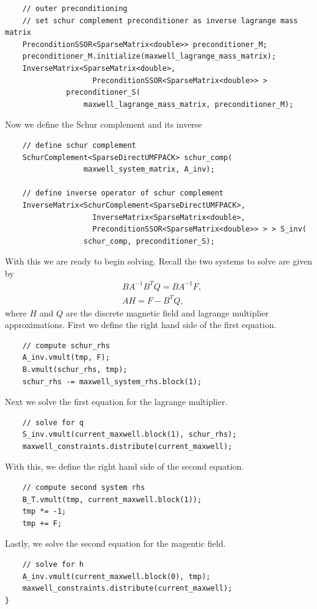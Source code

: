 \documentclass{article}
\begin{document}
\begin{lstlisting}
    // outer preconditioning
    // set schur complement preconditioner as inverse lagrange mass matrix
    PreconditionSSOR<SparseMatrix<double>> preconditioner_M;
    preconditioner_M.initialize(maxwell_lagrange_mass_matrix);
    InverseMatrix<SparseMatrix<double>,
                    PreconditionSSOR<SparseMatrix<double>> >
              preconditioner_S(
                  maxwell_lagrange_mass_matrix, preconditioner_M);
                  \end{lstlisting}
Now we define the Schur complement and its inverse
\begin{lstlisting}
    // define schur complement
    SchurComplement<SparseDirectUMFPACK> schur_comp(
                  maxwell_system_matrix, A_inv);

    // define inverse operator of schur complement
    InverseMatrix<SchurComplement<SparseDirectUMFPACK>,
                    InverseMatrix<SparseMatrix<double>,
                    PreconditionSSOR<SparseMatrix<double>> > > S_inv(
                  schur_comp, preconditioner_S);
\end{lstlisting}
With this we are ready to begin solving. Recall the two systems to solve are given by
\begin{align*}
    &BA^{-1}B^TQ = BA^{-1}F,\\
    &AH = F-B^TQ,
\end{align*}
where $H$ and $Q$ are the discrete magnetic field and lagrange multiplier approximations. 
First we define the right hand side of the first equation.
\begin{lstlisting}
    // compute schur_rhs
    A_inv.vmult(tmp, F);
    B.vmult(schur_rhs, tmp);
    schur_rhs -= maxwell_system_rhs.block(1);
\end{lstlisting}
Next we solve the first equation for the lagrange multiplier.
\begin{lstlisting}
    // solve for q
    S_inv.vmult(current_maxwell.block(1), schur_rhs);
    maxwell_constraints.distribute(current_maxwell);
\end{lstlisting}
With this, we define the right hand side of the second equation.
\begin{lstlisting}
    // compute second system rhs
    B_T.vmult(tmp, current_maxwell.block(1));
    tmp *= -1;
    tmp += F;
\end{lstlisting}
Lastly, we solve the second equation for the magentic field.
    \begin{lstlisting}
    // solve for h
    A_inv.vmult(current_maxwell.block(0), tmp);
    maxwell_constraints.distribute(current_maxwell);
}
\end{lstlisting}
\end{document}
